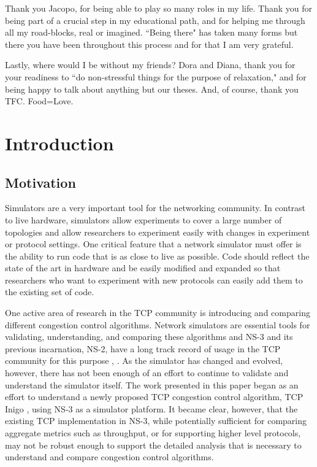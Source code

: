 \documentclass[11pt]{ucthesis}
\begin{document}
\begin{frontmatter}
\begin{acknowledgements}
Thank you Jacopo, for being able to play so many roles in my life. Thank you for being part of a crucial step in my educational path, and for helping me through all my road-blocks, real or imagined. ``Being there" has taken many forms but there you have been throughout this process and for that I am very grateful.

Lastly, where would I be without my friends? Dora and Diana, thank you for your readiness to ``do non-stressful things for the purpose of relaxation," and for being happy to talk about anything but our theses. And, of course, thank you TFC. Food=Love.

\end{acknowledgements}

\end{frontmatter}


\chapter{Introduction}

\section{Motivation}
Simulators are a very important tool for the networking community. In contrast to live hardware, simulators allow experiments to cover a large number of topologies and allow researchers to experiment easily with changes in experiment or protocol settings. One critical feature that a network simulator must offer is the ability to run code that is as close to live as possible. Code should reflect the state of the art in hardware and be easily modified and expanded so that researchers who want to experiment with new protocols can easily add them to the existing set of code. 

One active area of research in the TCP community is introducing and comparing different congestion control algorithms. Network simulators are essential tools for validating, understanding, and comparing these algorithms and NS-3 and its previous incarnation, NS-2, have a long track record of usage in the TCP community for this purpose \cite{NS2Val}, \cite{NS2WP}. As the simulator has changed and evolved, however, there has not been enough of an effort to continue to validate and understand the simulator itself. The work presented in this paper began as an effort to understand a newly proposed TCP congestion control algorithm, TCP Inigo \cite{Inigo}, using NS-3 as a simulator platform. It became clear, however, that the existing TCP implementation in NS-3, while potentially sufficient for comparing aggregate metrics such as throughput, or for supporting higher level protocols, may not be robust enough to support the detailed analysis that is necessary to understand and compare congestion control algorithms.
\end{document}
